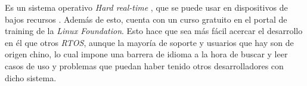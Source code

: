
Es un sistema operativo \textit{Hard real-time} \cite{RT-ThreadTeam2025}, que se puede usar en dispositivos de bajos recursos \cite{RT-ThreadTeam2024}. Además de esto, cuenta con un curso gratuito en el portal de training de la \textit{Linux Foundation}. Esto hace que sea más fácil acercar el desarrollo en él que otros \textit{RTOS}, aunque la mayoría de soporte y usuarios que hay son de origen chino, lo cual impone una barrera de idioma a la hora de buscar y leer casos de uso y problemas que puedan haber tenido otros desarrolladores con dicho sistema.
